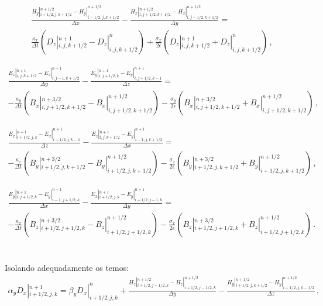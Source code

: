 \documentclass[a4paper,10pt]{article}
\begin{document}
\begin{eqnarray}
\frac{H_y|_{i+1/2,j,k+1/2}^{n+1/2}-H_y|_{i-1/2,j,k+1/2}^{n+1/2}}{\Delta x}-\frac{H_x|_{i,j+1/2,k+1/2}^{n+1/2}-H_x|_{i,j-1/2,k+1/2}^{n+1/2}}{\Delta y}= \nonumber\\
\frac{\kappa_x}{\Delta t} \left( D_z|_{i,j,k+1/2}^{n+1}-D_z|_{i,j,k+1/2}^{n}\right)+ \frac{\sigma_x}{2 \epsilon} \left(D_z|_{i,j,k+1/2}^{n+1}+D_z|_{i,j,k+1/2}^{n}\right) \,,
\end{eqnarray}

\begin{eqnarray}
\frac{E_z|_{i,j,k+1/2}^{n+1}-E_z|_{i,j-1,k+1/2}^{n+1}}{\Delta y}-\frac{E_y|_{i,j+1/2,k}^{n+1}-E_y|_{i,j+1/2,k-1}^{n+1}}{\Delta z}= \nonumber\\
-\frac{\kappa_y}{\Delta t} \left( B_x|_{i,j+1/2,k+1/2}^{n+3/2}-B_x|_{i,j+1/2,k+1/2}^{n+1/2}\right)- \frac{\sigma_y}{2 \epsilon} \left(B_x|_{i,j+1/2,k+1/2}^{n+3/2}+B_x|_{i,j+1/2,k+1/2}^{n+1/2}\right) \,,
\end{eqnarray}

\begin{eqnarray}
\frac{E_x|_{i+1/2,j,k}^{n+1}-E_x|_{i+1/2,j,k-1}^{n+1}}{\Delta z}-\frac{E_z|_{i,j,k+1/2}^{n+1}-E_y|_{i-1,j,k+1/2}^{n+1}}{\Delta x}= \nonumber\\
-\frac{\kappa_z}{\Delta t} \left( B_y|_{i+1/2,j,k+1/2}^{n+3/2}-B_y|_{i+1/2,j,k+1/2}^{n+1/2}\right)- \frac{\sigma_z}{2 \epsilon} \left(B_y|_{i+1/2,j,k+1/2}^{n+3/2}+B_y|_{i+1/2,j,k+1/2}^{n+1/2}\right) \,,
\end{eqnarray}

\begin{eqnarray}
\frac{E_y|_{i,j+1/2,k}^{n+1}-E_y|_{i-1,j+1/2,k}^{n+1}}{\Delta x}-\frac{E_x|_{i+1/2,j,k}^{n+1}-E_y|_{i+1/2,j-1,k}^{n+1}}{\Delta y}= \nonumber\\
-\frac{\kappa_x}{\Delta t} \left( B_z|_{i+1/2,j+1/2,k}^{n+3/2}-B_z|_{i+1/2,j+1/2,k}^{n+1/2}\right)- \frac{\sigma_x}{2 \epsilon} \left(B_z|_{i+1/2,j+1/2,k}^{n+3/2}+B_z|_{i+1/2,j+1/2,k}^{n+1/2}\right) \,.
\end{eqnarray}
\\ \\

Isolando adequadamente os temos:
\begin{align}
\alpha_y D_x|_{i+1/2,j,k}^{n+1}=\beta_y D_x|_{i+1/2,j,k}^{n} + \frac{H_z|_{i+1/2,j+1/2,k}^{n+1/2}-H_z|_{i+1/2,j-1/2,k}^{n+1/2}}{\Delta y}-\frac{H_y|_{i+1/2,j,k+1/2}^{n+1/2}-H_y|_{i+1/2,j,k-1/2}^{n+1/2}}{\Delta z}\,,
\end{align}
\end{document}
